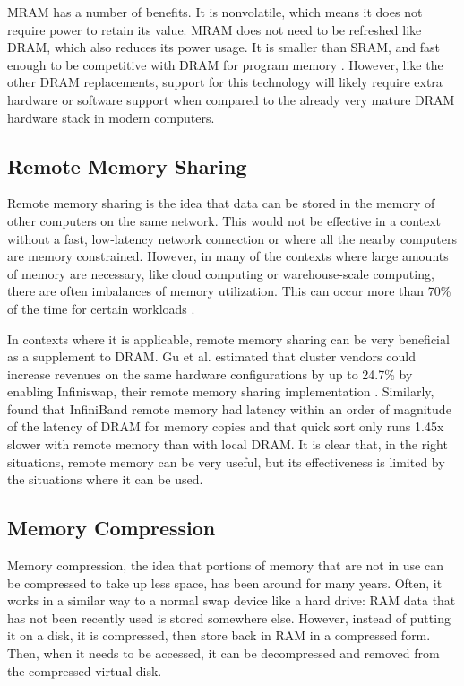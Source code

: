 \documentclass[doublespace,nopageskip]{VTthesis}
\begin{document}
MRAM has a number of benefits. It is nonvolatile, which means it does not require power to retain its value. MRAM does not need to be refreshed like DRAM, which also reduces its power usage. It is smaller than SRAM, and fast enough to be competitive with DRAM for program memory \cite{mram99, mramprospects}. However, like the other DRAM replacements, support for this technology will likely require extra hardware or software support when compared to the already very mature DRAM hardware stack in modern computers.

\subsection{Remote Memory Sharing}\label{ss:remote_memory_sharing}
Remote memory sharing is the idea that data can be stored in the memory of other computers on the same network. This would not be effective in a context without a fast, low-latency network connection or where all the nearby computers are memory constrained. However, in many of the contexts where large amounts of memory are necessary, like cloud computing or warehouse-scale computing, there are often imbalances of memory utilization. This can occur more than 70\% of the time for certain workloads \cite{infiniswap}.

In contexts where it is applicable, remote memory sharing can be very beneficial as a supplement to DRAM. Gu et al. estimated that cluster vendors could increase revenues on the same hardware configurations by up to 24.7\% by enabling Infiniswap, their remote memory sharing implementation \cite{infiniswap}. Similarly, \cite{swapinfiniband} found that InfiniBand remote memory had latency within an order of magnitude of the latency of DRAM for memory copies and that quick sort only runs 1.45x slower with remote memory than with local DRAM. It is clear that, in the right situations, remote memory can be very useful, but its effectiveness is limited by the situations where it can be used.

\subsection{Memory Compression}\label{ss:memory_compression}
Memory compression, the idea that portions of memory that are not in use can be compressed to take up less space, has been around for many years. Often, it works in a similar way to a normal swap device like a hard drive: RAM data that has not been recently used is stored somewhere else. However, instead of putting it on a disk, it is compressed, then store back in RAM in a compressed form. Then, when it needs to be accessed, it can be decompressed and removed from the compressed virtual disk.
\end{document}
